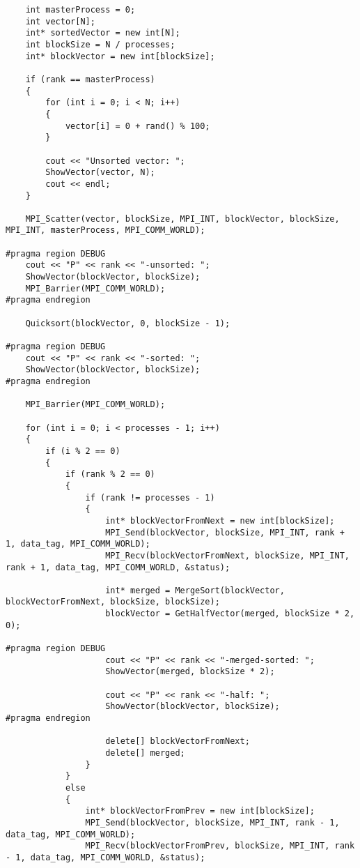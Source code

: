 \documentclass[a4paper,14pt]{extarticle}
\begin{document}
\begin{lstlisting}
    int masterProcess = 0;
    int vector[N];
    int* sortedVector = new int[N];
    int blockSize = N / processes;
    int* blockVector = new int[blockSize];

    if (rank == masterProcess) 
    {
        for (int i = 0; i < N; i++)
        {
            vector[i] = 0 + rand() % 100;
        }

        cout << "Unsorted vector: ";
        ShowVector(vector, N);
        cout << endl;
    }

    MPI_Scatter(vector, blockSize, MPI_INT, blockVector, blockSize, MPI_INT, masterProcess, MPI_COMM_WORLD);

#pragma region DEBUG
    cout << "P" << rank << "-unsorted: ";
    ShowVector(blockVector, blockSize);
    MPI_Barrier(MPI_COMM_WORLD);
#pragma endregion

    Quicksort(blockVector, 0, blockSize - 1);

#pragma region DEBUG
    cout << "P" << rank << "-sorted: ";
    ShowVector(blockVector, blockSize);
#pragma endregion

    MPI_Barrier(MPI_COMM_WORLD);

    for (int i = 0; i < processes - 1; i++) 
    {
        if (i % 2 == 0) 
        {
            if (rank % 2 == 0) 
            {
                if (rank != processes - 1) 
                {
                    int* blockVectorFromNext = new int[blockSize];
                    MPI_Send(blockVector, blockSize, MPI_INT, rank + 1, data_tag, MPI_COMM_WORLD);
                    MPI_Recv(blockVectorFromNext, blockSize, MPI_INT, rank + 1, data_tag, MPI_COMM_WORLD, &status);

                    int* merged = MergeSort(blockVector, blockVectorFromNext, blockSize, blockSize);
                    blockVector = GetHalfVector(merged, blockSize * 2, 0);

#pragma region DEBUG
                    cout << "P" << rank << "-merged-sorted: ";
                    ShowVector(merged, blockSize * 2);

                    cout << "P" << rank << "-half: ";
                    ShowVector(blockVector, blockSize);
#pragma endregion

                    delete[] blockVectorFromNext;
                    delete[] merged;
                }
            }
            else 
            {
                int* blockVectorFromPrev = new int[blockSize];
                MPI_Send(blockVector, blockSize, MPI_INT, rank - 1, data_tag, MPI_COMM_WORLD);
                MPI_Recv(blockVectorFromPrev, blockSize, MPI_INT, rank - 1, data_tag, MPI_COMM_WORLD, &status);


\end{lstlisting}
\end{document}
